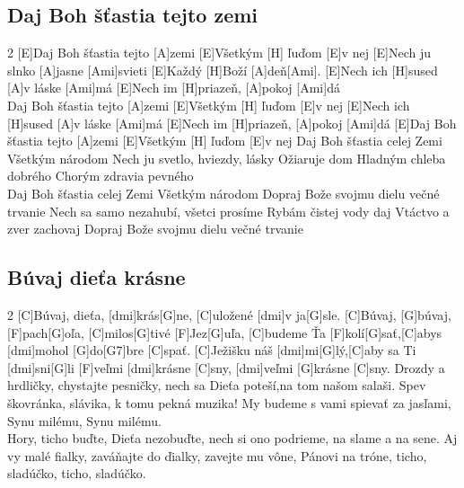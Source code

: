 \documentclass[12pt]{article}
\begin{document}
\subsection{Daj Boh šťastia tejto zemi}
\begin{multicols}{2}
	[E]Daj Boh šťastia tejto [A]zemi
	[E]Všetkým [H] ľuďom [E]v nej
	[E]Nech ju slnko [A]jasne [Ami]svieti
	[E]Každý [H]Boží [A]deň[Ami].
	[E]Nech ich [H]sused [A]v láske [Ami]má
	[E]Nech im [H]priazeň, [A]pokoj [Ami]dá
	\\
	[E]Daj Boh šťastia tejto [A]zemi
	[E]Všetkým [H] ľuďom [E]v nej
	[E]Nech ich [H]sused [A]v láske [Ami]má
	[E]Nech im [H]priazeň, [A]pokoj [Ami]dá
	[E]Daj Boh šťastia tejto [A]zemi
	[E]Všetkým [H] ľuďom [E]v nej
	\columnbreak
	Daj Boh šťastia celej Zemi
	Všetkým národom
	Nech ju svetlo, hviezdy, lásky
	Ožiaruje dom
	Hladným chleba dobrého
	Chorým zdravia pevného
	\\
	Daj Boh šťastia celej Zemi
	Všetkým národom
	Dopraj Bože svojmu dielu večné trvanie
	Nech sa samo nezahubí, všetci prosíme
	Rybám čistej vody daj
	Vtáctvo a zver zachovaj
	Dopraj Bože svojmu dielu večné trvanie
\end{multicols}

\subsection{Búvaj dieťa krásne}
\begin{multicols}{2}
	[C]Búvaj, dieťa, [dmi]krás[G]ne, [C]uložené [dmi]v ja[G]sle.
	[C]Búvaj, [G]búvaj, [F]pach[G]oľa, [C]milos[G]tivé [F]Jez[G]uľa,
	[C]budeme Ťa [F]kolí[G]sať,[C]abys [dmi]mohol [G]do[G7]bre [C]spať.
	[C]Ježišku náš [dmi]mi[G]lý,[C]aby sa Ti [dmi]sni[G]li
	[F]veľmi [dmi]krásne [C]sny, [dmi]veľmi [G]krásne [C]sny.
	\columnbreak
	Drozdy a hrdličky, chystajte pesničky,
	nech sa Dieťa poteší,na tom našom salaši.
	Spev škovránka, slávika, k tomu pekná muzika!
	My budeme s vami spievať za jasľami,
	Synu milému, Synu milému.
	\\
	Hory, ticho buďte, Dieťa nezobuďte,
	nech si ono podrieme, na slame a na sene.
	Aj vy malé fialky, zaváňajte do ďialky,
	zavejte mu vône, Pánovi na tróne,
	ticho, sladúčko, ticho, sladúčko.
\end{multicols}
\end{document}
